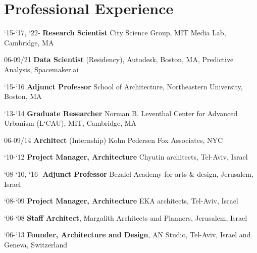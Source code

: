 \section*{Professional Experience}

\begin{tablist}
   \item[`15-`17, `22-]\tab\textbf{Research Scientist}
   City Science Group, MIT Media Lab, Cambridge, MA

   \item[06-09/21]\tab\textbf{Data Scientist} (Residency),
   Autodesk, Boston, MA, Predictive Analysis, Spacemaker.ai

   \item[`15-`16]\tab\textbf{Adjunct Professor}
   School of Architecture, Northeastern University, Boston, MA

   \item[`13-`14]\tab\textbf{Graduate Researcher}
   Norman B. Leventhal Center for Advanced Urbanism (L`CAU), MIT, Cambridge, MA

   \item[06-09/14]\tab\textbf{Architect} (Internship)
   Kohn Pedersen Fox Associates, NYC

   \item[`10-`12]\tab
   \textbf{Project Manager, Architecture} Chyutin architects, Tel-Aviv, Israel

   \item[`08-`10, `16-]\tab\textbf{Adjunct Professor}
   Bezalel Academy for arts \& design, Jerusalem, Israel

   \item[`08-`09]\tab\textbf{Project Manager, Architecture}
   EKA architects, Tel-Aviv, Israel

   \item[`06-`08]\tab\textbf{Staff Architect},
   Margalith Architects and Planners, Jerusalem, Israel

   \item[`06-`13]\tab
   \textbf{Founder, Architecture and Design},
   AN Studio, Tel-Aviv, Israel and Geneva, Switzerland
\end{tablist}
